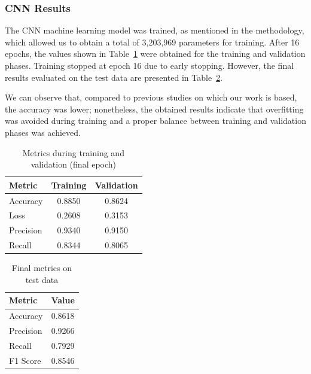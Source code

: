 \subsubsection{CNN Results}
\label{sec:cnn_results}

The CNN machine learning model was trained, as mentioned in the methodology, which allowed us to obtain a total of 3,203,969 parameters for training. After 16 epochs, the values shown in Table~\ref{tab:train_metrics} were obtained for the training and validation phases. Training stopped at epoch 16 due to early stopping. However, the final results evaluated on the test data are presented in Table~\ref{tab:test_metrics}.

We can observe that, compared to previous studies on which our work is based, the accuracy was lower; nonetheless, the obtained results indicate that overfitting was avoided during training and a proper balance between training and validation phases was achieved.

\begin{table}[h]
    \centering
    \caption{Metrics during training and validation (final epoch)}
    \label{tab:train_metrics}
    \begin{tabular}{lcc}
        \toprule
        Metric         & Training & Validation \\
        \midrule
        Accuracy       & 0.8850   & 0.8624     \\
        Loss           & 0.2608   & 0.3153     \\
        Precision      & 0.9340   & 0.9150     \\
        Recall         & 0.8344   & 0.8065     \\
        \bottomrule
    \end{tabular}
\end{table}

\begin{table}[h]
    \centering
    \caption{Final metrics on test data}
    \label{tab:test_metrics}
    \begin{tabular}{lc}
        \toprule
        Metric    & Value   \\
        \midrule
        Accuracy  & 0.8618  \\
        Precision & 0.9266  \\
        Recall    & 0.7929  \\
        F1 Score  & 0.8546  \\
        \bottomrule
    \end{tabular}
\end{table}


